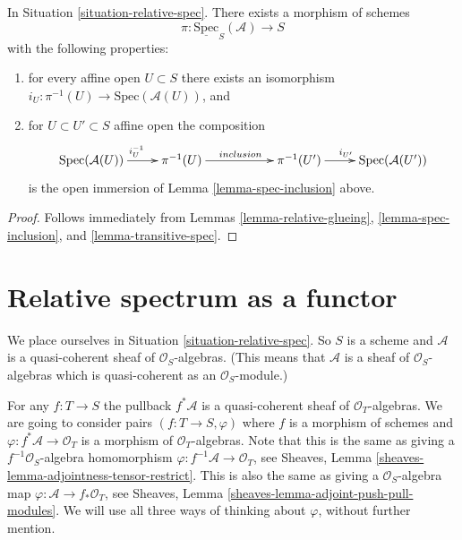 \begin{lemma}
\label{lemma-glue-relative-spec}
In Situation \ref{situation-relative-spec}.
There exists a morphism of schemes
$$
\pi : \underline{\text{Spec}}_S(\mathcal{A}) \longrightarrow S
$$
with the following properties:
\begin{enumerate}
\item for every affine open $U \subset S$ there exists an isomorphism
$i_U : \pi^{-1}(U) \to \text{Spec}(\mathcal{A}(U))$, and
\item for $U \subset U' \subset S$ affine open the composition
$$
\xymatrix{
\text{Spec}(\mathcal{A}(U)) \ar[r]^{i_U^{-1}} &
\pi^{-1}(U) \ar[rr]^{inclusion} & &
\pi^{-1}(U') \ar[r]^{i_{U'}} &
\text{Spec}(\mathcal{A}(U'))
}
$$
is the open immersion of Lemma \ref{lemma-spec-inclusion} above.
\end{enumerate}
\end{lemma}

\begin{proof}
Follows immediately from
Lemmas \ref{lemma-relative-glueing},
\ref{lemma-spec-inclusion}, and
\ref{lemma-transitive-spec}.
\end{proof}












\section{Relative spectrum as a functor}
\label{section-spec}

\noindent
We place ourselves in Situation \ref{situation-relative-spec}.
So $S$ is a scheme and $\mathcal{A}$ is a quasi-coherent sheaf of
$\mathcal{O}_S$-algebras. (This means that $\mathcal{A}$ is a
sheaf of $\mathcal{O}_S$-algebras which is quasi-coherent as an
$\mathcal{O}_S$-module.)

\medskip\noindent
For any $f : T \to S$ the pullback
$f^*\mathcal{A}$ is a quasi-coherent sheaf of $\mathcal{O}_T$-algebras.
We are going to consider pairs $(f : T \to S, \varphi)$ where
$f$ is a morphism of schemes and $\varphi : f^*\mathcal{A} \to \mathcal{O}_T$
is a morphism of $\mathcal{O}_T$-algebras. Note that this is the
same as giving a $f^{-1}\mathcal{O}_S$-algebra homomorphism
$\varphi : f^{-1}\mathcal{A} \to \mathcal{O}_T$, see
Sheaves, Lemma \ref{sheaves-lemma-adjointness-tensor-restrict}.
This is also the same as giving a $\mathcal{O}_S$-algebra map
$\varphi : \mathcal{A} \to f_*\mathcal{O}_T$, see
Sheaves, Lemma \ref{sheaves-lemma-adjoint-push-pull-modules}.
We will use all three ways of thinking about $\varphi$,
without further mention.

